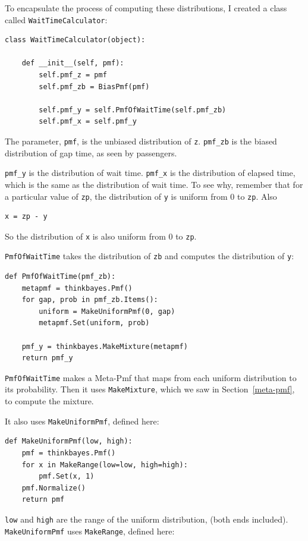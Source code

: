 \documentclass[12pt]{book}
\begin{document}
To encapsulate the process of computing these distributions, I
created a class called {\tt WaitTimeCalculator}:

\begin{verbatim}
class WaitTimeCalculator(object):

    def __init__(self, pmf):
        self.pmf_z = pmf
        self.pmf_zb = BiasPmf(pmf)

        self.pmf_y = self.PmfOfWaitTime(self.pmf_zb)
        self.pmf_x = self.pmf_y
\end{verbatim}

The parameter, {\tt pmf}, is the unbiased distribution of {\tt z}.
\verb"pmf_zb" is the biased distribution of gap time, as seen by
passengers.

\verb"pmf_y" is the distribution of wait time.  \verb"pmf_x" is the
distribution of elapsed time, which is the same as the distribution of
wait time.  To see why, remember that for a particular value of
{\tt zp}, the distribution of {\tt y} is uniform from 0 to {\tt zp}.
Also
%
\begin{verbatim}
x = zp - y
\end{verbatim}
%
So the distribution of {\tt x} is also uniform from 0 to {\tt zp}.

{\tt PmfOfWaitTime} takes the distribution of {\tt zb} and
computes the distribution of {\tt y}:

\begin{verbatim}
def PmfOfWaitTime(pmf_zb):
    metapmf = thinkbayes.Pmf()
    for gap, prob in pmf_zb.Items():
        uniform = MakeUniformPmf(0, gap)
        metapmf.Set(uniform, prob)

    pmf_y = thinkbayes.MakeMixture(metapmf)
    return pmf_y
\end{verbatim}

{\tt PmfOfWaitTime} makes a Meta-Pmf that maps from each uniform
distribution to its probability.  Then it uses {\tt MakeMixture},
which we saw in Section~\ref{meta-pmf}, to compute the mixture.

It also uses {\tt MakeUniformPmf}, defined here:

\begin{verbatim}
def MakeUniformPmf(low, high):
    pmf = thinkbayes.Pmf()
    for x in MakeRange(low=low, high=high):
        pmf.Set(x, 1)
    pmf.Normalize()
    return pmf
\end{verbatim}

{\tt low} and {\tt high} are the range of the uniform distribution,
(both ends included).  {\tt MakeUniformPmf} uses {\tt MakeRange},
defined here:
\end{document}

